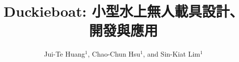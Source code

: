 \documentclass[letterpaper, 10 pt, conference]{ieeeconf}
\title{\LARGE \bf
Duckieboat: 小型水上無人載具設計、開發與應用}
\author{Jui-Te Huang$^{1}$, Chao-Chun Hsu$^{1}$, and Sin-Kiat Lim$^{1}$}
\begin{document}
\begin{CJK}{UTF8}{bkai}

    \maketitle

    \thispagestyle{empty}
    \pagestyle{empty}


    

    

    

    

    

    

    

    
    
    





    
    

\end{CJK}
\end{document}
